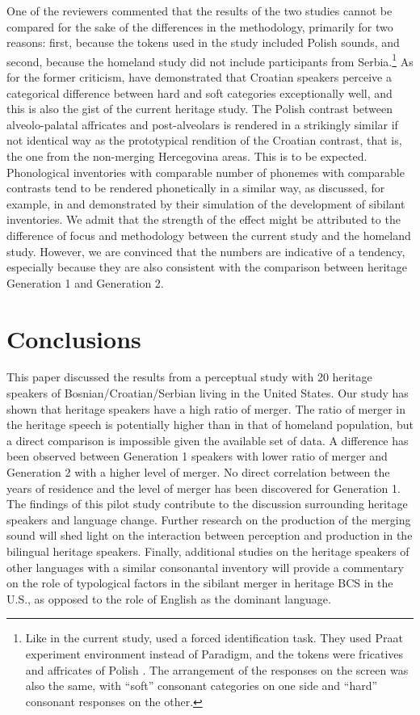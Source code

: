 \documentclass[output=paper,modfonts,newtxmath,hidelinks,]{langscibook}
\begin{document}
  
One of the reviewers commented that the results of the two studies cannot be compared for the sake of the differences in the methodology, primarily for two reasons: first, because the tokens used in the \citet{Cavar-Hamann2011} study included Polish sounds, and second, because the homeland study did not include participants from Serbia.\footnote{Like in the current study, \citeauthor{Cavar-Hamann2011} used a forced identification task. They used Praat experiment environment instead of Paradigm, and the tokens were fricatives and affricates of Polish \citep{Boersma-Weenink_praat}. The arrangement of the responses on the screen was also the same, with “soft” consonant categories on one side and “hard” consonant responses on the other.} As for the former criticism, \citet{Cavar-Hamann2011} have demonstrated that Croatian speakers perceive a categorical difference between hard and soft categories exceptionally well, and this is also the gist of the current heritage study. The Polish contrast between alveolo-palatal affricates and post-alveolars is rendered in a strikingly similar if not identical way as the prototypical rendition of the Croatian contrast, that is, the one from the non-merging Hercegovina areas. This is to be expected. Phonological inventories with comparable number of phonemes with comparable contrasts tend to be rendered phonetically in a similar way, as discussed, for example, in \citet{Boersma-Hamann2008} and demonstrated by their simulation of the development of sibilant inventories. We admit that the strength of the effect might be attributed to the difference of focus and methodology between the current study and the homeland study. However, we are convinced that the numbers are indicative of a tendency, especially because they are also consistent with the comparison between heritage Generation 1 and Generation 2.


\section{Conclusions}\label{sec:mihajlovic:7}

This paper discussed the results from a perceptual study with 20 heritage speakers of Bosnian/Croatian/Serbian living in the United States. Our study has shown that heritage speakers have a high ratio of merger. The ratio of merger in the heritage speech is potentially higher than in that of homeland population, but a direct comparison is impossible given the available set of data. {A} difference has been observed between Generation 1 speakers with lower ratio of merger and Generation 2 with a higher level of merger. No direct correlation between the years of residence and the level of merger has been discovered for Generation 1. The findings of this pilot study contribute to the discussion surrounding heritage speakers and language change. Further research on the production of the merging sound will shed light on the interaction between perception and production in the bilingual heritage speakers. Finally, additional studies on the heritage speakers of other languages with a similar consonantal inventory will provide a commentary on the role of typological factors in the sibilant merger in heritage BCS in the U.S., as opposed to the role of English as the dominant language.
\end{document}
